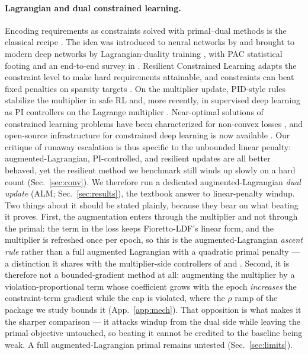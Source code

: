 \documentclass[10pt]{article}
\begin{document}
\paragraph{Lagrangian and dual constrained learning.}
Encoding requirements as constraints solved with primal--dual methods is
the classical recipe \citep{bertsekas1982constrained}. The idea was
introduced to neural networks by \citet{platt1988constrained} and brought
to modern deep networks by Lagrangian-duality training
\citep{fioretto2020lagrangian}, with PAC statistical footing
\citep{chamon2020probably,chamon2022constrained} and an end-to-end survey
in \citet{kotary2021end}. Resilient Constrained Learning
\citep{hounie2023resilient} adapts the constraint level to make hard
requirements attainable, and constraints can beat fixed penalties on
sparsity targets \citep{gallego2022controlled}. On the multiplier update,
PID-style rules stabilize the multiplier in safe RL
\citep{stooke2020responsive} and, more recently, in supervised deep
learning as PI controllers on the Lagrange multiplier
\citep{sohrabi2024pi}. Near-optimal solutions of constrained learning
problems have been characterized for non-convex losses
\citep{elenter2024near}, and open-source infrastructure for constrained
deep learning is now available \citep{gallego2024cooper}. Our critique of
runaway escalation is thus specific to the unbounded linear penalty:
augmented-Lagrangian, PI-controlled, and resilient updates are all better
behaved, yet the resilient method we benchmark still winds up slowly on a
hard count (Sec.~\ref{sec:conv}). 
{We therefore run a dedicated augmented-Lagrangian \emph{dual update}
(ALM; Sec.~\ref{sec:results}), the textbook answer to linear-penalty windup. Two
things about it should be stated plainly, because they bear on what beating it
proves. First, the augmentation enters through the multiplier and not through the
primal: the term in the loss keeps Fioretto-LDF's linear form, and the multiplier
is refreshed once per epoch, so this is the augmented-Lagrangian \emph{ascent
rule} rather than a full augmented Lagrangian with a quadratic primal penalty
\citep{bertsekas1982constrained} --- a distinction it shares with the
multiplier-side controllers of \citet{stooke2020responsive} and
\citet{sohrabi2024pi}. Second, it is therefore not a bounded-gradient method at
all: augmenting the multiplier by a violation-proportional term whose coefficient
grows with the epoch \emph{increases} the constraint-term gradient while the cap
is violated, where the $\rho$ ramp of the package we study bounds it
(App.~\ref{app:mech}). That opposition is what makes it the sharper comparison
--- it attacks windup from the dual side while leaving the primal objective
untouched, so beating it cannot be credited to the baseline being weak. A full
augmented-Lagrangian primal remains untested (Sec.~\ref{sec:limits}).}
\end{document}
